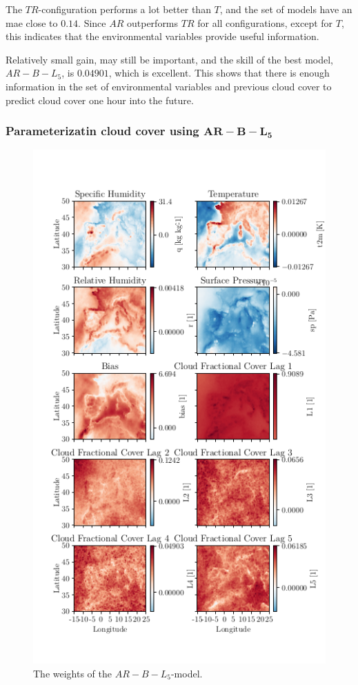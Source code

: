 The $TR$-configuration performs a lot better than $T$, and the set of models have an \acrshort{mae} close to $0.14$. Since $AR$ outperforms $TR$ for all configurations, except for $T$, this indicates that the environmental variables provide useful information. 

Relatively small gain, may still be important, and the skill of the best model, $AR-B-L_5$, is $0.04901$, which is excellent. This shows that there is enough information in the set of environmental variables and previous cloud cover to predict cloud cover one hour into the future.

\subsubsection{Parameterizatin cloud cover using $\mathbf{AR-B-L_5}$}
\begin{figure}
    \centering
    \includegraphics[scale=0.87]{python_figs/weights_AR-B-L5_best_ar_model.png}
    \caption{The weights of the $AR-B-L_5$-model.}
    \label{fig:weights_best_model}
\end{figure}
